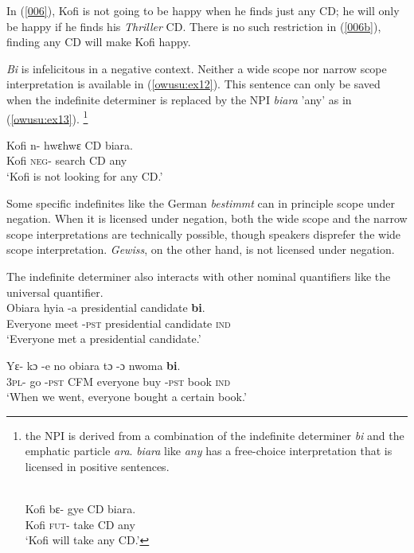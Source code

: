 \documentclass[output=paper,modfonts,nonflat,draftmode]{langsci/langscibook}
\begin{document}
In (\ref{006}), Kofi is not going to be happy when he finds just any CD; he will only be happy if he finds his \emph{Thriller} CD. There is no such restriction in (\ref{006b}), finding any CD will make Kofi happy.

\emph{Bi} is infelicitous in a negative context. Neither a wide scope nor narrow scope interpretation is available in (\ref{owusu:ex12}). This sentence can only be saved when the indefinite determiner is replaced by the NPI \emph{biara} 'any' as in (\ref{owusu:ex13}). \footnote{the NPI is derived from a combination of the indefinite determiner \emph{bi} and the emphatic particle \emph{ara}. \emph{biara} like \emph{any} has a free-choice interpretation that is licensed in positive sentences.

\ea
{}\\
\label{owusu:ex120}
\gll  Kofi  bε- gye CD biara.\\
Kofi \textsc{fut}-  take CD any \\
\glt `Kofi will take any CD.'
\z 
}  
\ea
{}\\


\ex\label{owusu:ex13}
\gll  Kofi n- hwεhwε CD biara.\\
Kofi \textsc{neg}-  search CD any \\
\glt `Kofi is not looking for any CD.'
\z \z 

Some specific indefinites like the German \emph{bestimmt} can in principle scope under negation. When it is licensed under negation, both the wide scope and the narrow scope interpretations are technically possible, though speakers disprefer the wide scope interpretation. \emph{Gewiss}, on the other hand, is not licensed under negation.

The indefinite determiner also interacts with other nominal quantifiers like the universal quantifier. 
\ea 
{}\\
  \ea\label{owusu:ex100}
\gll Obiara hyia -a presidential candidate  \textbf{bi}. \\
    Everyone meet -\textsc{pst} presidential candidate \textsc{ind} \\
\glt `Everyone met a presidential candidate.'

\ex\label{owusu:ex15:2}
\gll  Yε- kɔ -e no obiara tɔ -ɔ  nwoma \textbf{bi}.\\
3\textsc{pl}- go -\textsc{pst}  CFM everyone buy -\textsc{pst} book \textsc{ind} \\
\glt `When we went, everyone bought a certain book.'
\z \z
 
\end{document}
